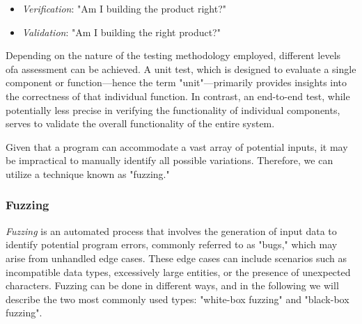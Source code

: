 \begin{itemize}[label={}]
    \item \textit{Verification}: "Am I building the product right?" 
    \item \textit{Validation}: "Am I building the right product?"
\end{itemize}
Depending on the nature of the testing methodology employed, different levels ofa assessment can be achieved. A unit test, which is designed to evaluate a single component or function—hence the term "unit"—primarily provides insights into the correctness of that individual function. In contrast, an end-to-end test, while potentially less precise in verifying the functionality of individual components, serves to validate the overall functionality of the entire system. 

Given that a program can accommodate a vast array of potential inputs, it may be impractical to manually identify all possible variations. Therefore, we can utilize a technique known as "fuzzing."

\subsubsection{Fuzzing}
\label{sec:fuzzing}
\textit{Fuzzing} is an automated process that involves the generation of input data to identify potential program errors, commonly referred to as "bugs," which may arise from unhandled edge cases. These edge cases can include scenarios such as incompatible data types, excessively large entities, or the presence of unexpected characters.
Fuzzing can be done in different ways, and in the following we will describe the two most commonly used types: "white-box fuzzing" and "black-box fuzzing".


